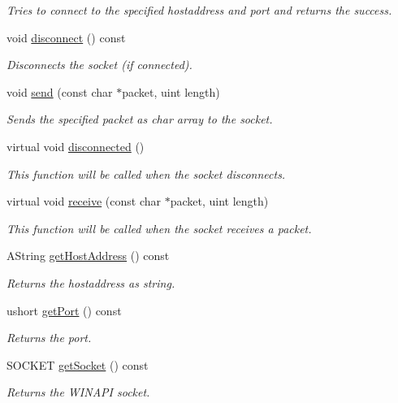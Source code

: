 \begin{DoxyCompactItemize}
\begin{DoxyCompactList}\small\item\em Tries to connect to the specified hostaddress and port and returns the success. \end{DoxyCompactList}\item 
\mbox{\label{class_tcp_socket_a9f1317cd06b134fc78d01fe8554224a2}} 
void \mbox{\hyperlink{class_tcp_socket_a9f1317cd06b134fc78d01fe8554224a2}{disconnect}} () const
\begin{DoxyCompactList}\small\item\em Disconnects the socket (if connected). \end{DoxyCompactList}\item 
void \mbox{\hyperlink{class_tcp_socket_a9e62b6ef15b2e10d2aa8316439651cd3}{send}} (const char $\ast$packet, uint length)
\begin{DoxyCompactList}\small\item\em Sends the specified packet as char array to the socket. \end{DoxyCompactList}\item 
\mbox{\label{class_tcp_socket_af177ab759106456e4c46b81a90a5c8ed}} 
virtual void \mbox{\hyperlink{class_tcp_socket_af177ab759106456e4c46b81a90a5c8ed}{disconnected}} ()
\begin{DoxyCompactList}\small\item\em This function will be called when the socket disconnects. \end{DoxyCompactList}\item 
virtual void \mbox{\hyperlink{class_tcp_socket_a5c3aedf1e5387e02204d423e39dd6bee}{receive}} (const char $\ast$packet, uint length)
\begin{DoxyCompactList}\small\item\em This function will be called when the socket receives a packet. \end{DoxyCompactList}\item 
A\+String \mbox{\hyperlink{class_tcp_socket_a1638a4368afb26acee666ea497ba737e}{get\+Host\+Address}} () const
\begin{DoxyCompactList}\small\item\em Returns the hostaddress as string. \end{DoxyCompactList}\item 
ushort \mbox{\hyperlink{class_tcp_socket_aae788fccc721be52ff85c0fcbb1424c5}{get\+Port}} () const
\begin{DoxyCompactList}\small\item\em Returns the port. \end{DoxyCompactList}\item 
S\+O\+C\+K\+ET \mbox{\hyperlink{class_tcp_socket_af08fd94259257c41adcc7b3722574dc6}{get\+Socket}} () const
\begin{DoxyCompactList}\small\item\em Returns the W\+I\+N\+A\+PI socket. \end{DoxyCompactList}\end{DoxyCompactItemize}
